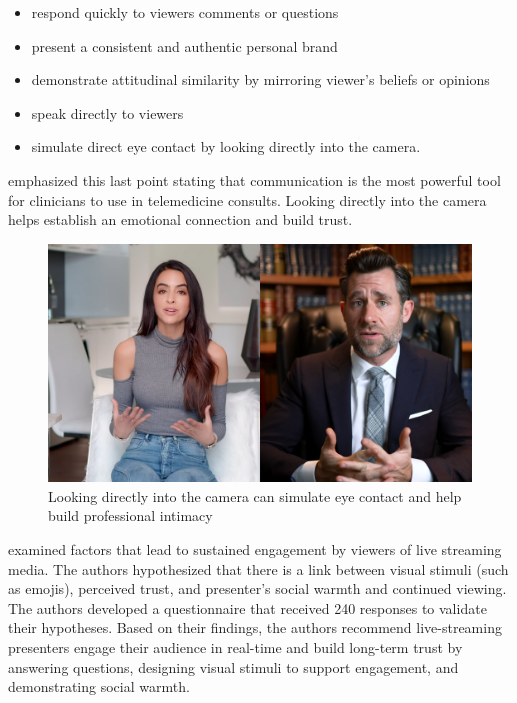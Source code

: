 \documentclass[utf8]{FrontiersinHarvard} %
\begin{document}
\begin{itemize}
\item respond quickly to viewers comments or questions
\item present a consistent and authentic personal brand
\item demonstrate attitudinal similarity by mirroring viewer's beliefs or opinions
\item speak directly to viewers
\item simulate direct eye contact by looking directly into the camera.
\end{itemize}

\citet{baroniStateArtTelerehabilitation2023} emphasized this last point stating that communication is the most powerful tool for clinicians to use in telemedicine consults. Looking directly into the camera helps establish an emotional connection and build trust.

\begin{figure}[!htbp]
\centering
\includegraphics[width=0.7\linewidth]{files/tgSYYIag2qhHH1yPOHt4-8051cc119966c3d24ece6c3c215db7c8.png}
\caption[]{Looking directly into the camera can simulate eye contact and help build professional intimacy}
\label{bD1TUn2aPV}
\end{figure}

\citet{lvHowLiveStreaming2022} examined factors that lead to sustained engagement by viewers of live streaming media. The authors hypothesized that there is a link between visual stimuli (such as emojis), perceived trust, and presenter's social warmth and continued viewing. The authors developed a questionnaire that received 240 responses to validate their hypotheses. Based on their findings, the authors recommend live-streaming presenters engage their audience in real-time and build long-term trust by answering questions, designing visual stimuli to support engagement, and demonstrating social warmth.
\end{document}
